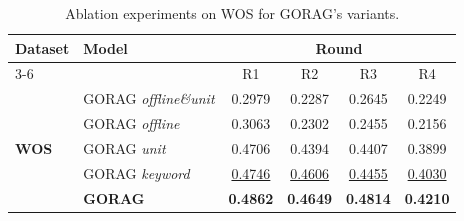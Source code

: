 \begin{table}[t]
	\centering
	\caption{Ablation experiments on WOS for GORAG's variants.}
	
	\label{tab:gorag:ablation}
	\small
		\begin{tabular}{l|l|c|c|c|c} 
			\hline\hline
			\multirow{2}{*}{\textbf{Dataset}} & \multirow{2}{*}{\textbf{Model}} & \multicolumn{4}{c}{\textbf{Round}}                                        \\ 
			\cline{3-6}
			& & R1              & R2         & R3           & R4  \\ 
			\hline
			\multirow{5}{*}{\textbf{WOS}} 
			& GORAG \textit{offline\&unit}          &     0.2979            &     0.2287            &       0.2645          &      0.2249                        \\
			& GORAG \textit{offline}          &     0.3063            &     0.2302            &       0.2455          &      0.2156                        \\
			&  GORAG \textit{unit}             & 0.4706          & 0.4394          & 0.4407          & 0.3899                      \\
			& GORAG \textit{keyword}         & \underline{0.4746}          & \underline{0.4606}          & \underline{0.4455}          & \underline{0.4030}             \\ 
			& \textbf{GORAG}                           & \textbf{0.4862}          &  \textbf{0.4649}              &     \textbf{0.4814}            &       \textbf{0.4210}                    \\
			\hline\hline
			
			
			
			
			
			
		\end{tabular}
	
\end{table}
